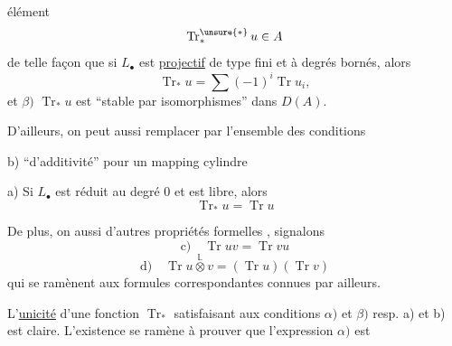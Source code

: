 élément
\[
\operatorname{Tr}_{*}^{\unsure{*}}u\in A
\]
de telle façon que \inserted{$\alpha)$} si $L_\bullet$ est \uline{projectif} de type fini et à degrés bornés, alors
\[
\operatorname{Tr}_*u=\sum(-1)^i\operatorname{Tr}u_i,
\]
et $\beta)$ $\operatorname{Tr}_*u$ est ``stable par isomorphismes'' dans $D(A)$.

D'ailleurs, on peut aussi remplacer par l'ensemble des conditions

b) ``d'additivité'' pour un mapping cylindre


a) Si $L_\bullet$ est réduit au degré $0$ et est libre, alors
\[
\operatorname{Tr}_*u=\operatorname{Tr}u
\]

 De plus, on  aussi d'autres propriétés formelles , signalons
\[
\text{c)}\quad\operatorname{Tr}uv=\operatorname{Tr}vu
\]
\[
\text{d)}\quad\operatorname{Tr}u\overset{\mathbb L}{\otimes}v=(\operatorname{Tr}u)(\operatorname{Tr}v)
\]
qui se ramènent aux formules correspondantes connues par ailleurs.

L'\uline{unicité} d'une fonction $\operatorname{Tr}_*$ satisfaisant aux conditions $\alpha)$ et $\beta)$ resp. a) et b) est claire. L'existence  se ramène à prouver que l'expression $\alpha)$ est
